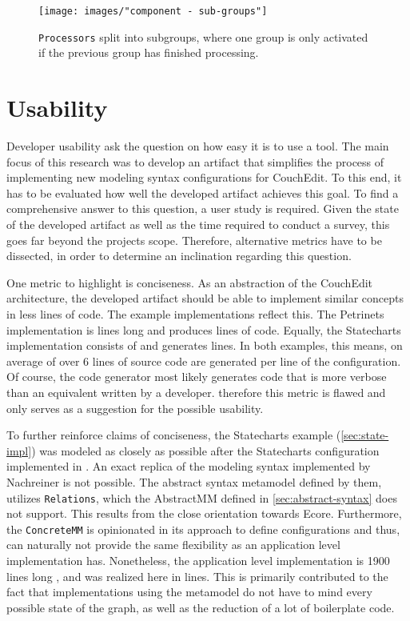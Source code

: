 \begin{figure}
\centering
\texttt{[image: images/"component - sub-groups"]}
\caption{\texttt{Processors} split into subgroups, where one group is only activated if the previous group has finished processing.}
\label{fig:sub-groups}
\end{figure}

\section{Usability}
Developer usability ask the question on how easy it is to use a tool. The main focus of this research was to develop an artifact that simplifies the process of implementing new modeling syntax configurations for CouchEdit. To this end, it has to be evaluated how well the developed artifact achieves this goal. To find a comprehensive answer to this question, a user study is required. Given the state of the developed artifact as well as the time required to conduct a survey, this goes far beyond the projects scope. Therefore, alternative metrics have to be dissected, in order to determine an inclination regarding this question. 

One metric to highlight is conciseness. As an abstraction of the CouchEdit architecture, the developed artifact should be able to implement similar concepts in less lines of code. The example implementations reflect this. The Petrinets implementation is \petriConfigLoC lines long and produces \petriGeneratedLoC lines of code. Equally, the Statecharts implementation consists of \stateConfigLoC and generates \stateGeneratedLoC lines. In both examples, this means, on average of over 6 lines of source code are generated per line of the configuration. Of course, the code generator most likely generates code that is more verbose than an equivalent written by a developer. therefore this metric is flawed and only serves as a suggestion for the possible usability. 

To further reinforce claims of conciseness, the Statecharts example (\ref{sec:state-impl}) was modeled as closely as possible after the Statecharts configuration implemented in \cite{nachreiner_couchedit_2020}. An exact replica of the modeling syntax implemented by Nachreiner is not possible. The abstract syntax metamodel defined by them, utilizes \texttt{Relations}, which the AbstractMM defined in \ref{sec:abstract-syntax} does not support. This results from the close orientation towards Ecore. Furthermore, the \texttt{ConcreteMM} is opinionated in its approach to define configurations and thus, can naturally not provide the same flexibility as an application level implementation has. Nonetheless, the application level implementation is 1900 lines long \cite{nachreiner_couchedit_2020}, and was realized here in \stateConfigLoC lines. This is primarily contributed to the fact that implementations using the metamodel do not have to mind every possible state of the graph, as well as the reduction of a lot of boilerplate code.

